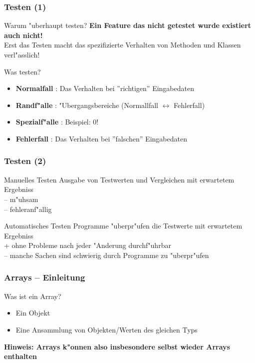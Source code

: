 \documentclass{beamer}
\begin{document}
\begin{frame}
\frametitle{Testen (1)}
\begin{block}{Warum "uberhaupt testen?}
\pause
\textbf{\glqq Ein Feature das nicht getestet wurde existiert auch nicht!\grqq} \\[1em]
Erst das Testen macht das spezifizierte Verhalten von Methoden und Klassen verl"asslich!
\end{block}

\pause

\begin{block}{Was testen?}
\begin{itemize}
\item \textbf{Normalfall} : Das Verhalten bei  ''richtigen'' Eingabedaten
\item \textbf{Randf"alle} : "Ubergangsbereiche (Normallfall $\leftrightarrow$ Fehlerfall)
\item \textbf{Spezialf"alle} : Beispiel: 0!
\item \textbf{Fehlerfall} : Das Verhalten bei ''falschen'' Eingabedaten
\end{itemize}
\end{block}
\end{frame}


\begin{frame}
\frametitle{Testen (2)}
\begin{block}{Manuelles Testen}
Ausgabe von Testwerten und Vergleichen mit erwartetem Ergebniss\\[1em]
-- m"uhsam\\
-- fehleranf"allig
\end{block}

\begin{block}{Automatisches Testen}
Programme "uberpr"ufen die Testwerte mit erwartetem Ergebniss\\[1em]
+ ohne Probleme nach jeder "Anderung durchf"uhrbar\\
-- manche Sachen sind schwierig durch Programme zu "uberpr"ufen
\end{block}
\end{frame}


\begin{frame}
\frametitle{Arrays -- Einleitung}
\begin{block}{Was ist ein Array?}
\pause
\begin{itemize}
\item Ein Objekt
\item Eine Ansammlung von Objekten/Werten des gleichen Typs
\end{itemize}
\textbf{Hinweis: Arrays k"onnen also insbesondere selbst wieder Arrays enthalten}
\end{block}
\end{frame}
\end{document}
